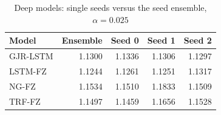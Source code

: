 \begin{table}[htbp]
\centering
\footnotesize
\caption{Deep models: single seeds versus the seed ensemble, $\alpha=0.025$}
\label{tab:seeds}
\begin{tabular}{lrrrr}
\toprule
Model & Ensemble & Seed 0 & Seed 1 & Seed 2 \\
\midrule
GJR-LSTM & 1.1300 & 1.1336 & 1.1306 & 1.1297 \\
LSTM-FZ & 1.1244 & 1.1261 & 1.1251 & 1.1317 \\
NG-FZ & 1.1534 & 1.1510 & 1.1833 & 1.1509 \\
TRF-FZ & 1.1497 & 1.1459 & 1.1656 & 1.1528 \\
\bottomrule
\end{tabular}
\end{table}